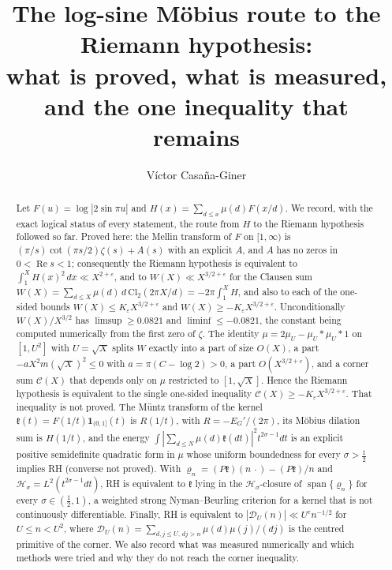 \documentclass[11pt,reqno]{amsart}
\numberwithin{equation}{section}
\theoremstyle{plain}
\theoremstyle{definition}
\theoremstyle{remark}
\begin{document}
\title[The log-sine M\"obius route]{The log-sine M\"obius route to the Riemann hypothesis:\\ what is proved, what is measured, and the one inequality that remains}
\author{V\'ictor Casa\~na-Giner}
\date{}

\begin{abstract}
Let $F(u)=\log|2\sin\pi u|$ and $H(x)=\sum_{d\le x}\mu(d)F(x/d)$. We record, with the exact logical status of every statement, the route from $H$ to the Riemann hypothesis followed so far. Proved here: the Mellin transform of $F$ on $[1,\infty)$ is $(\pi/s)\cot(\pi s/2)\zeta(s)+A(s)$ with an explicit $A$, and $A$ has no zeros in $0<\operatorname{Re}s<1$; consequently the Riemann hypothesis is equivalent to $\int_1^XH(x)^2\,dx\ll X^{2+\varepsilon}$, and to $W(X)\ll X^{3/2+\varepsilon}$ for the Clausen sum $W(X)=\sum_{d\le X}\mu(d)\,d\,\mathrm{Cl}_2(2\pi X/d)=-2\pi\int_1^XH$, and also to each of the one-sided bounds $W(X)\le K_\varepsilon X^{3/2+\varepsilon}$ and $W(X)\ge-K_\varepsilon X^{3/2+\varepsilon}$. Unconditionally $W(X)/X^{3/2}$ has $\limsup\ge0.0821$ and $\liminf\le-0.0821$, the constant being computed numerically from the first zero of $\zeta$. The identity $\mu=2\mu_U-\mu_U*\mu_U*1$ on $[1,U^2]$ with $U=\sqrt X$ splits $W$ exactly into a part of size $O(X)$, a part $-aX^2m(\sqrt X)^2\le0$ with $a=\pi(C-\log2)>0$, a part $O(X^{3/2+\varepsilon})$, and a corner sum $\mathcal C(X)$ that depends only on $\mu$ restricted to $[1,\sqrt X]$. Hence the Riemann hypothesis is equivalent to the single one-sided inequality $\mathcal C(X)\ge-K_\varepsilon X^{3/2+\varepsilon}$. That inequality is not proved. The M\"untz transform of the kernel $\mathfrak k(t)=F(1/t)\mathbf 1_{(0,1]}(t)$ is $R(1/t)$, with $R=-E_G'/(2\pi)$, its M\"obius dilation sum is $H(1/t)$, and the energy $\int|\sum_{d\le N}\mu(d)\mathfrak k(dt)|^2t^{2\sigma-1}dt$ is an explicit positive semidefinite quadratic form in $\mu$ whose uniform boundedness for every $\sigma>\frac12$ implies RH (converse not proved). With $\varrho_n=(P\mathfrak k)(n\,\cdot)-(P\mathfrak k)/n$ and $\mathcal H_\sigma=L^2(t^{2\sigma-1}dt)$, RH is equivalent to $\mathfrak k$ lying in the $\mathcal H_\sigma$-closure of $\operatorname{span}\{\varrho_n\}$ for every $\sigma\in(\frac12,1)$, a weighted strong Nyman--Beurling criterion for a kernel that is not continuously differentiable. Finally, RH is equivalent to $|\mathcal D_U(n)|\ll U^\varepsilon n^{-1/2}$ for $U\le n<U^2$, where $\mathcal D_U(n)=\sum_{d,j\le U,\,dj>n}\mu(d)\mu(j)/(dj)$ is the centred primitive of the corner. We also record what was measured numerically and which methods were tried and why they do not reach the corner inequality.
\end{abstract}
\end{document}
